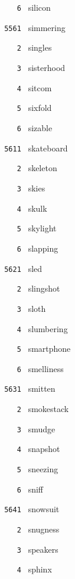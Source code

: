 \documentclass[11pt]{article}
\begin{document}
\begin{multicols}{6}
\noindent \texttt{ \ \ \ 6 } silicon  \par
\vspace{3mm}
\noindent \texttt{ 5561 } simmering  \par
\noindent \texttt{ \ \ \ 2 } singles  \par
\noindent \texttt{ \ \ \ 3 } sisterhood  \par
\noindent \texttt{ \ \ \ 4 } sitcom  \par
\noindent \texttt{ \ \ \ 5 } sixfold  \par
\noindent \texttt{ \ \ \ 6 } sizable  \par
\noindent \texttt{ 5611 } skateboard  \par
\noindent \texttt{ \ \ \ 2 } skeleton  \par
\noindent \texttt{ \ \ \ 3 } skies  \par
\noindent \texttt{ \ \ \ 4 } skulk  \par
\noindent \texttt{ \ \ \ 5 } skylight  \par
\noindent \texttt{ \ \ \ 6 } slapping  \par
\vspace{3mm}
\noindent \texttt{ 5621 } sled  \par
\noindent \texttt{ \ \ \ 2 } slingshot  \par
\noindent \texttt{ \ \ \ 3 } sloth  \par
\noindent \texttt{ \ \ \ 4 } slumbering  \par
\noindent \texttt{ \ \ \ 5 } smartphone  \par
\noindent \texttt{ \ \ \ 6 } smelliness  \par
\vspace{3mm}
\noindent \texttt{ 5631 } smitten  \par
\noindent \texttt{ \ \ \ 2 } smokestack  \par
\noindent \texttt{ \ \ \ 3 } smudge  \par
\noindent \texttt{ \ \ \ 4 } snapshot  \par
\noindent \texttt{ \ \ \ 5 } sneezing  \par
\noindent \texttt{ \ \ \ 6 } sniff  \par
\vspace{3mm}
\noindent \texttt{ 5641 } snowsuit  \par
\noindent \texttt{ \ \ \ 2 } snugness  \par
\noindent \texttt{ \ \ \ 3 } speakers  \par
\noindent \texttt{ \ \ \ 4 } sphinx  \par

\end{multicols}
\end{document}
